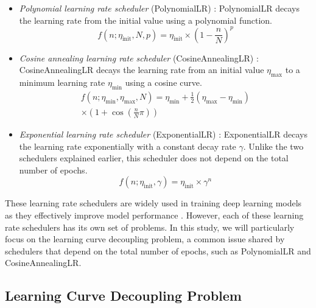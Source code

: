 \documentclass{article}
\theoremstyle{plain}
\theoremstyle{definition}
\theoremstyle{remark}
\begin{document}
\begin{itemize}
   \item \textit{Polynomial learning rate scheduler} (PolynomialLR) \cite{chen2017deeplab,liu2015parsenet}:
         PolynomialLR decays the learning rate from the initial value using a polynomial function.
         \begin{equation}
            f(n; \eta_\text{init}, N, p) = \eta_\text{init} \times \left(1 - \frac{n}{N}\right)^p
         \end{equation}

   \item \textit{Cosine annealing learning rate scheduler} (CosineAnnealingLR) \cite{loshchilov2016sgdr}:
         CosineAnnealingLR decays the learning rate from an initial value $\eta_\text{max}$ to a minimum learning rate $\eta_\text{min}$ using a cosine curve.
         \begin{equation}
         \begin{split}
         f(n; \eta_\text{min}, \eta_\text{max}, N) = \eta_\text{min} + \frac{1}{2} (\eta_\text{max} - \eta_\text{min}) \\
                                                    \times (1 + \cos \left( \frac{n}{N} \pi\right ))
         \end{split}
         \end{equation}

   \item \textit{Exponential learning rate scheduler} (ExponentialLR) \cite{ioffe2015batch}:
         ExponentialLR decays the learning rate exponentially with a constant decay rate $\gamma$.
         Unlike the two schedulers explained earlier, this scheduler does not depend on the total number of epochs.
         \begin{equation}
         f(n; \eta_\text{init}, \gamma) = \eta_\text{init} \times \gamma^{n}
         \end{equation}
\end{itemize}

These learning rate schedulers are widely used in training deep learning models as they effectively improve model performance \cite{pytorch2024optim, papers2024code}.
However, each of these learning rate schedulers has its own set of problems.
In this study, we will particularly focus on the learning curve decoupling problem, a common issue shared by schedulers that depend on the total number of epochs, such as PolynomialLR and CosineAnnealingLR.

\subsection{Learning Curve Decoupling Problem}
\end{document}
